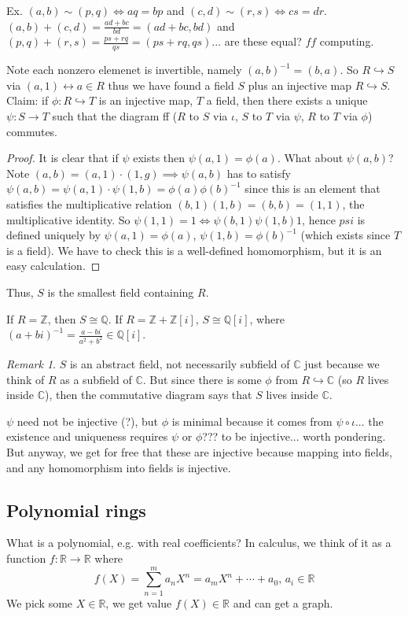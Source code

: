 \documentclass{article}
\theoremstyle{plain}
\theoremstyle{remark}
\newtheorem{remark}{Remark}
\newcommand{\Z}{{\mathbb Z}}
\newcommand{\Q}{{\mathbb Q}}
\newcommand{\R}{{\mathbb R}}
\newcommand{\C}{{\mathbb C}}
\begin{document}
Ex. $(a,b) \sim (p,q) \iff aq = bp$ and $(c,d) \sim (r,s) \iff cs = dr$.
$(a,b) + (c,d) = \frac{ad+bc}{bd} = (ad+bc,bd)$
and $(p,q) + (r,s) = \frac{ps+rq}{qs} = (ps+rq,qs)$... are these equal?
$ff$ computing.

Note each nonzero elemenet is invertible, namely $(a,b)^{-1} = (b,a)$.
So $R \hookrightarrow S$ via $(a,1) \leftrightarrow a \in R$
thus we have found a field $S$ plus an injective map $R \hookrightarrow S$.
Claim: if $\phi \colon R \hookrightarrow T$ is an injective map,
$T$ a field, then there exists a unique $\psi \colon S \to T$ such that the diagram
ff ($R$ to $S$ via $\iota$, $S$ to $T$ via $\psi$, $R$ to $T$ via $\phi$)
commutes.
\begin{proof}
	It is clear that if $\psi$ exists then $\psi(a,1) = \phi(a)$.
	What about $\psi(a,b)$?
	Note $(a,b) = (a,1)\cdot(1,g) \implies \psi(a,b)$ has to satisfy
	$\psi(a,b) = \psi(a,1)\cdot\psi(1,b) = \phi(a)\phi(b)^{-1}$
	since this is an element that satisfies the multiplicative relation
	$(b,1)(1,b) = (b,b) = (1,1)$, the multiplicative identity.
	So $\psi(1,1) = 1 \iff \psi(b,1)\psi(1,b) 1$,
	hence $psi$ is defined uniquely by $\psi(a,1) = \phi(a)$,
	$\psi(1,b) = \phi(b)^{-1}$ (which exists since $T$ is a field).
	We have to check this is a well-defined homomorphism, but it is an easy calculation.
\end{proof}
Thus, $S$ is the smallest field containing $R$.

If $R = \Z$, then $S \cong \Q$.
If $R = \Z + \Z[i]$, $S \cong \Q[i]$,
where $(a+bi)^{-1} = \frac{a-bi}{a^2+b^2} \in \Q[i]$.
\begin{remark}
	$S$ is an abstract field, not necessarily subfield of $\C$
	just because we think of $R$ as a subfield of $\C$.
	But since there is some $\phi$ from $R \hookrightarrow \C$
	(so $R$ lives inside $\C$),
	then the commutative diagram says that $S$ lives inside $\C$.
\end{remark}
$\psi$ need not be injective (?),
but $\phi$ is minimal because it comes from $\psi \circ \iota$...
the existence and uniqueness requires $\psi$ or $\phi$??? to be injective...
worth pondering.
But anyway, we get for free that these are injective because mapping into fields,
and any homomorphism into fields is injective.

\subsection{Polynomial rings}
What is a polynomial, e.g. with real coefficients?
In calculus, we think of it as a function $f \colon \R \to \R$ where
\[
	f(X) = \sum_{n=1}^m a_nX^n = a_mX^n + \cdots + a_0, \, a_i \in \R
\]
We pick some $X \in \R$, we get value $f(X) \in \R$ and can get a graph.
\end{document}
